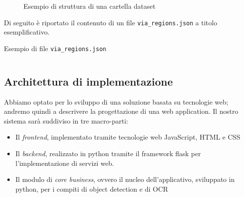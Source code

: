 \documentclass[12pt,a4paper]{article}
\begin{document}
\begin{figure}[H]
    \caption{Esempio di struttura di una cartella dataset}
    \centering
\end{figure}

Di seguito è riportato il contenuto di un file
\texttt{via\_regions.json} a titolo esemplificativo.

\begin{listing}[H]
    \caption{Esempio di file \texttt{via\_regions.json}}
    \inputminted{json}{via_regions.json}
\end{listing}

\subsection{Architettura di implementazione}

Abbiamo optato per lo sviluppo di una soluzione basata su tecnologie
web; andremo quindi a descrivere la progettazione di una web
application. Il nostro sistema sarà suddiviso in tre macro-parti:

\begin{itemize}
    \item Il \textit{frontend}, implementato tramite tecnologie web
        JavaScript, HTML e CSS
    \item Il \textit{backend}, realizzato in python tramite il
        framework flask per l'implementazione di servizi web.
    \item Il modulo di \textit{core business}, ovvero il nucleo
        dell'applicativo, sviluppato in python, per i compiti di object
        detection e di OCR
\end{itemize}
\end{document}
